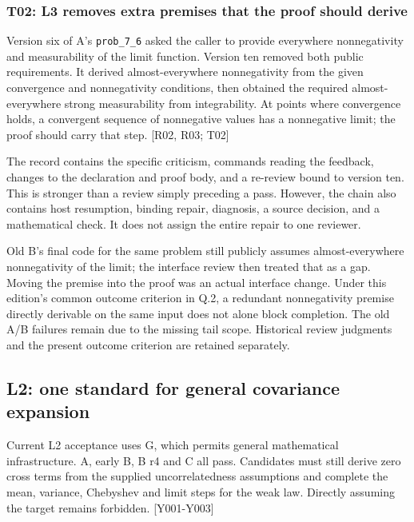 \subsubsection[T02: L3 removes extra premises that the proof should derive]{\texorpdfstring{\protect\hypertarget{g14-2}{}T02: L3 removes extra premises that the proof should derive}{T02: L3 removes extra premises that the proof should derive}}
Version six of A's \nolinkurl{prob_7_6} asked the caller to provide everywhere nonnegativity and measurability of the limit function. Version ten removed both public requirements. It derived almost-everywhere nonnegativity from the given convergence and nonnegativity conditions, then obtained the required almost-everywhere strong measurability from integrability. At points where convergence holds, a convergent sequence of nonnegative values has a nonnegative limit; the proof should carry that step. [R02, R03; T02]

The record contains the specific criticism, commands reading the feedback, changes to the declaration and proof body, and a re-review bound to version ten. This is stronger than a review simply preceding a pass. However, the chain also contains host resumption, binding repair, diagnosis, a source decision, and a mathematical check. It does not assign the entire repair to one reviewer.

Old B's final code for the same problem still publicly assumes almost-everywhere nonnegativity of the limit; the interface review then treated that as a gap. Moving the premise into the proof was an actual interface change. Under this edition's common outcome criterion in Q.2, a redundant nonnegativity premise directly derivable on the same input does not alone block completion. The old A/B failures remain due to the missing tail scope. Historical review judgments and the present outcome criterion are retained separately.

\subsection[L2: one standard for general covariance expansion]{\texorpdfstring{\protect\hypertarget{g15}{}L2: one standard for general covariance expansion}{L2: one standard for general covariance expansion}}
Current L2 acceptance uses G, which permits general mathematical infrastructure. A, early B, B r4 and C all pass. Candidates must still derive zero cross terms from the supplied uncorrelatedness assumptions and complete the mean, variance, Chebyshev and limit steps for the weak law. Directly assuming the target remains forbidden. [Y001-Y003]

